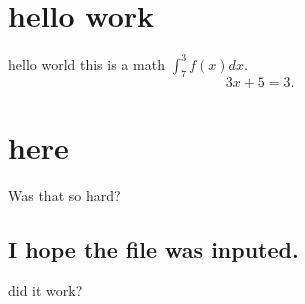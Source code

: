 \documentclass{amsart}
\begin{document}
	
	\section{hello work}\label{hello-work}

hello world this is a math \(\int_7^3 f(x) dx\). \[3x+5 = 3.\]

\section{here}\label{here}

Was that so hard?

\subsection{I hope the file was
inputed.}\label{i-hope-the-file-was-inputed.}

did it work?
	
\end{document}
